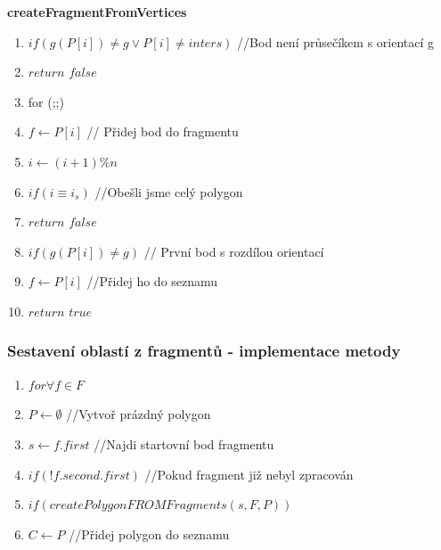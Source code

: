 \documentclass[a4paper, 12pt]{article}
\begin{document}
\vspace{1cm}

\textbf{createFragmentFromVertices}

\begin{enumerate}
	\item  $ if (g(P[i]) \neq g \vee P[i] \neq inters) $ //Bod není průsečíkem s orientací g
	\item \hspace{1cm} $ return $ $ false $ 
	\item for (;;) 
	\item \hspace{1cm} $  f \longleftarrow P[i] $ // Přidej bod do fragmentu
	\item \hspace{1cm} $ i \longleftarrow (i+1)\%n $
	\item \hspace{1cm} $ if (i \equiv i_s) $ //Obešli jsme celý polygon
	\item \hspace{2cm} $ return$  $ false $ 
	\item \hspace{1cm} $ if (g(P[i]) \neq g)  $ // První bod s rozdílou orientací
	\item \hspace{2cm} $ f \longleftarrow P[i] $ //Přidej ho do seznamu
	\item \hspace{2cm} $ return$  $true $

\end{enumerate}

\clearpage

\subsubsection{Sestavení oblastí z fragmentů - implementace metody}
\begin{enumerate}
	\item $ for \forall f \in F $
	\item \hspace{1cm} $ P \longleftarrow \emptyset $ //Vytvoř prázdný polygon
	\item \hspace{1cm} $ s \longleftarrow f.first $ //Najdi startovní bod fragmentu
	\item \hspace{1cm} $ if (!f.second.first) $ //Pokud fragment již nebyl zpracován
		\item \hspace{2cm} $ if (createPolygonFROMFragments(s,F,P)) $ 
			\item \hspace{3cm} $ C \longleftarrow P $ //Přidej polygon do seznamu	
\end{enumerate}
\end{document}
